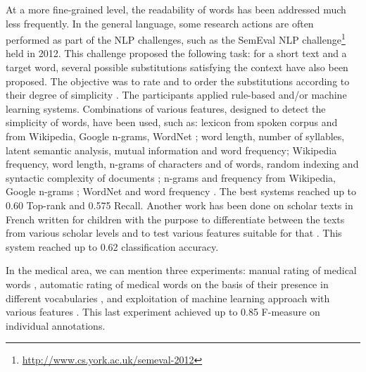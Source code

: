 At a more fine-grained level, the readability of words has been
addressed much less frequently. In the general language, some research
actions are often performed as part of the NLP challenges, such as the
SemEval NLP challenge\footnote{\url{http://www.cs.york.ac.uk/semeval-2012}} held
in 2012. This challenge proposed the following task: for a short text
and a target word, several possible substitutions satisfying the
context have also been proposed. The objective was to rate and to
order the substitutions according to their degree of simplicity
\citep{specia-SEMEVAL2012}. The participants applied rule-based and/or
machine learning systems. Combinations of various features, designed
to detect the simplicity of words, have been used, such as: lexicon
from spoken corpus and from Wikipedia, Google n-grams, WordNet
\citep{sinha-SEMEVAL2012}; word length, number of syllables, latent
semantic analysis, mutual information and word
frequency\citep{jauhar-SEMEVAL2012}; Wikipedia frequency, word length,
n-grams of characters and of words, random indexing and syntactic
complexity of documents \citep{johannsen-SEMEVAL2012}; n-grams and
frequency from Wikipedia, Google n-grams \citep{ligozat-SEMEVAL2012};
WordNet and word frequency \citep{amoia-SEMEVAL2012}. The best systems
reached up to 0.60 Top-rank and 0.575 Recall.
Another work has been done on scholar texts in French written for
children with the purpose to differentiate between the texts from
various scholar levels and to test various features suitable for that
\citep{Gala-ELEX2013}. This system reached up to 0.62 classification
accuracy.

In the medical area, we can mention three experiments: manual rating
of medical words \citep{Zheng-AMIA2002}, automatic rating of medical
words on the basis of their presence in different vocabularies
\citep{Borst-MIE2008}, and exploitation of machine learning approach
with various features \citep{Grabar-PITR2014}. This last experiment
achieved up to 0.85 F-measure on individual annotations.

